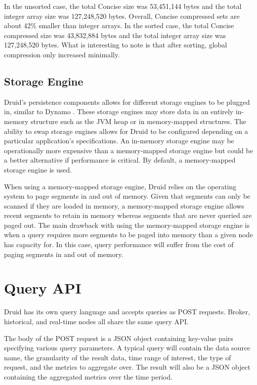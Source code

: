 \documentclass{sig-alternate-2013}
\begin{document}
In the unsorted case, the total Concise size was 53,451,144 bytes and the total
integer array size was 127,248,520 bytes. Overall, Concise compressed sets are
about 42\% smaller than integer arrays.  In the sorted case, the total Concise
compressed size was 43,832,884 bytes and the total integer array size was
127,248,520 bytes.  What is interesting to note is that after sorting, global
compression only increased minimally.

\subsection{Storage Engine}
Druid’s persistence components allows for different storage engines to be
plugged in, similar to Dynamo \cite{decandia2007dynamo}. These storage engines
may store data in an entirely in-memory structure such as the JVM heap or in
memory-mapped structures. The ability to swap storage engines allows for Druid
to be configured depending on a particular application’s specifications. An
in-memory storage engine may be operationally more expensive than a
memory-mapped storage engine but could be a better alternative if performance
is critical. By default, a memory-mapped storage engine is used.

When using a memory-mapped storage engine, Druid relies on the operating system
to page segments in and out of memory.  Given that segments can only be scanned
if they are loaded in memory, a memory-mapped storage engine allows recent
segments to retain in memory whereas segments that are never queried are paged
out. The main drawback with using the memory-mapped storage engine is when a
query requires more segments to be paged into memory than a given node has
capacity for. In this case, query performance will suffer from the cost of
paging segments in and out of memory.

\section{Query API}
\label{sec:query-api}
Druid has its own query language and accepts queries as POST requests. Broker,
historical, and real-time nodes all share the same query API.

The body of the POST request is a JSON object containing key-value pairs
specifying various query parameters. A typical query will contain the data
source name, the granularity of the result data, time range of interest, the
type of request, and the metrics to aggregate over. The result will also be a
JSON object containing the aggregated metrics over the time period.
\end{document}
